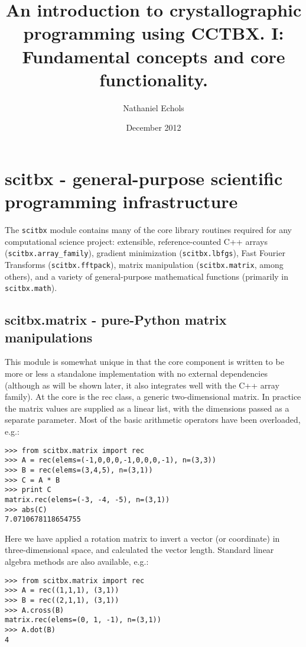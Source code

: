 \documentclass{article}
\title{An introduction to crystallographic programming using CCTBX. I: Fundamental concepts and core functionality.}
\author[1]{Nathaniel Echols} %
\affil[1]{Lawrence Berkeley National Laboratory}
\date{December 2012}
\begin{document}
\maketitle


\section{scitbx - general-purpose scientific programming infrastructure}


The {\tt scitbx} module contains many of the core library routines required for
any computational science project: extensible, reference-counted C++ arrays
({\tt scitbx.array\_family}), gradient minimization ({\tt scitbx.lbfgs}), Fast
Fourier Transforms ({\tt scitbx.fftpack}), matrix manipulation
({\tt scitbx.matrix}, among others), and a variety of general-purpose
mathematical functions (primarily in {\tt scitbx.math}).


\subsection{scitbx.matrix - pure-Python matrix manipulations}

This module is somewhat unique in that the core component is written to be more
or less a standalone implementation with no external dependencies (although as
will be shown later, it also integrates well with the C++ array family).  At
the core is the rec class, a generic two-dimensional matrix.  In practice the
matrix values are supplied as a linear list, with the dimensions passed as a
separate parameter.  Most of the basic arithmetic operators have been
overloaded, e.g.:

\begin{Verbatim}
>>> from scitbx.matrix import rec
>>> A = rec(elems=(-1,0,0,0,-1,0,0,0,-1), n=(3,3))
>>> B = rec(elems=(3,4,5), n=(3,1))
>>> C = A * B
>>> print C
matrix.rec(elems=(-3, -4, -5), n=(3,1))
>>> abs(C)
7.0710678118654755
\end{Verbatim}


Here we have applied a rotation matrix to invert a vector (or coordinate) in
three-dimensional space, and calculated the vector length.  Standard linear
algebra methods are also available, e.g.:

\begin{Verbatim}
>>> from scitbx.matrix import rec
>>> A = rec((1,1,1), (3,1))
>>> B = rec((2,1,1), (3,1))
>>> A.cross(B)
matrix.rec(elems=(0, 1, -1), n=(3,1))
>>> A.dot(B)
4
\end{Verbatim}
\end{document}
